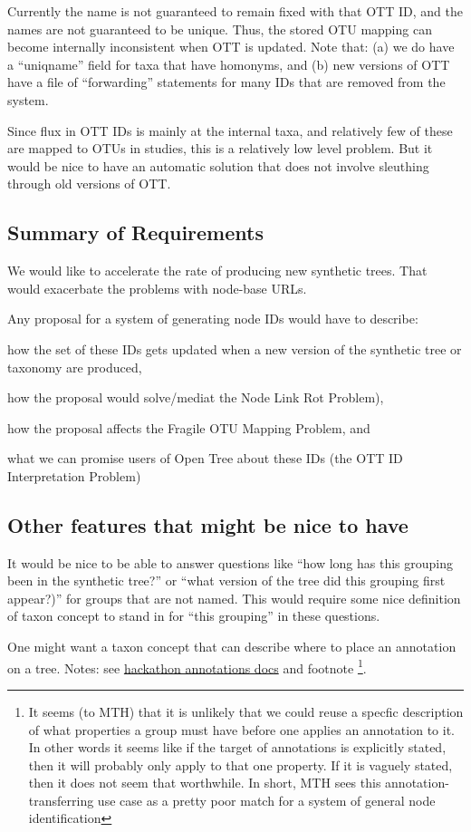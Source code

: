\documentclass[11pt]{article}
\newcommand{\nodeLinkRot}{Node Link Rot Problem\xspace}
\newcommand{\ottIdInterpretation}{OTT ID Interpretation Problem\xspace}
\newcommand{\fragileOTUMapping}{Fragile OTU Mapping Problem\xspace}
\begin{document}
Currently the name is not guaranteed to remain fixed with that OTT ID, and the
  names are not guaranteed to be unique.
Thus, the stored OTU mapping can become internally inconsistent when OTT is updated.
Note that: (a) we do have a ``uniqname'' field for taxa that have homonyms, and (b)
  new versions of OTT have a file of ``forwarding'' statements for many IDs that 
  are removed from the system.

Since flux in OTT IDs is mainly at the internal taxa, and relatively few of these
  are mapped to OTUs in studies, this is a relatively low level problem.
But it would be nice to have an automatic solution that does not involve sleuthing
  through old versions of OTT.

\subsection{Summary of Requirements}
We would like to accelerate the rate of producing new synthetic trees.
That would exacerbate the problems with node-base URLs.


Any proposal for a system of generating node IDs would have to describe:
\begin{compactenum}
  \item how the
    set of these IDs gets updated when a new version of the synthetic tree or taxonomy are produced,
  \item how the proposal would solve/mediat the \nodeLinkRot), 
  \item how the proposal affects the \fragileOTUMapping, and
  \item what we can promise users of Open Tree about these IDs (the \ottIdInterpretation)
\end{compactenum}
\subsection{Other features that might be nice to have}
\begin{compactenum}
  \item It would be nice to be able to answer questions like ``how long has this grouping
been in the synthetic tree?'' or ``what version of the tree did this grouping first appear?)''
  for groups that are not named.
  This would require some nice definition of taxon concept to stand in for ``this grouping'' in these questions.
  \item One might want a taxon concept that can describe where to place an annotation on a tree.
  Notes: see \href{https://docs.google.com/document/d/1MbiQwy5ImaWUzzCudmkLwKj82oe-QC__e5krsQJ8umE/edit}{hackathon annotations docs} and footnote
  \footnote{
  It seems (to MTH) that it is unlikely that we could reuse a specfic description
    of what properties a group must have before one applies an annotation to it.
  In other words it seems like if the target of annotations is explicitly stated,
    then it will probably only apply to that one property.
  If it is vaguely stated, then it does not seem that worthwhile.
  In short, MTH sees this annotation-transferring use case as a pretty poor
    match for a system of general node identification}.
\end{compactenum}
\end{document}
